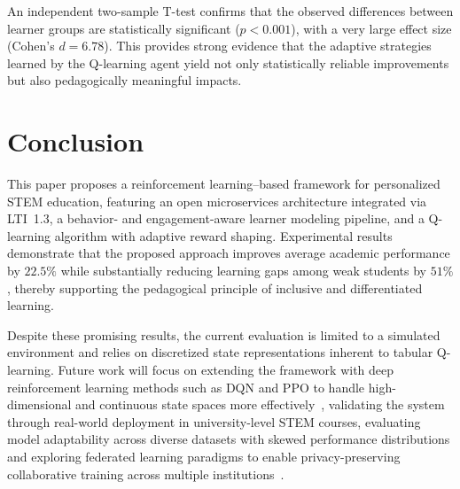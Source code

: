 \documentclass[9pt, conference, a4paper, compsocconf]{IEEEtran}
\begin{document}
An independent two-sample T-test confirms that the observed differences between learner groups are statistically significant ($p < 0.001$), with a very large effect size (Cohen's $d = 6.78$). This provides strong evidence that the adaptive strategies learned by the Q-learning agent yield not only statistically reliable improvements but also pedagogically meaningful impacts.

\section{Conclusion}
\label{sec:conclusion}

This paper proposes a reinforcement learning–based framework for personalized STEM education, featuring an open microservices architecture integrated via LTI~1.3, a behavior- and engagement-aware learner modeling pipeline, and a Q-learning algorithm with adaptive reward shaping. Experimental results demonstrate that the proposed approach improves average academic performance by $22.5\%$ while substantially reducing learning gaps among weak students by $51\%$, thereby supporting the pedagogical principle of inclusive and differentiated learning.

Despite these promising results, the current evaluation is limited to a simulated environment and relies on discretized state representations inherent to tabular Q-learning. Future work will focus on extending the framework with deep reinforcement learning methods such as DQN and PPO to handle high-dimensional and continuous state spaces more effectively~\cite{mnih2015human}, validating the system through real-world deployment in university-level STEM courses, evaluating model adaptability across diverse datasets with skewed performance distributions and exploring federated learning paradigms to enable privacy-preserving collaborative training across multiple institutions~\cite{gligorea2023adaptive}.

\balance
\end{document}
